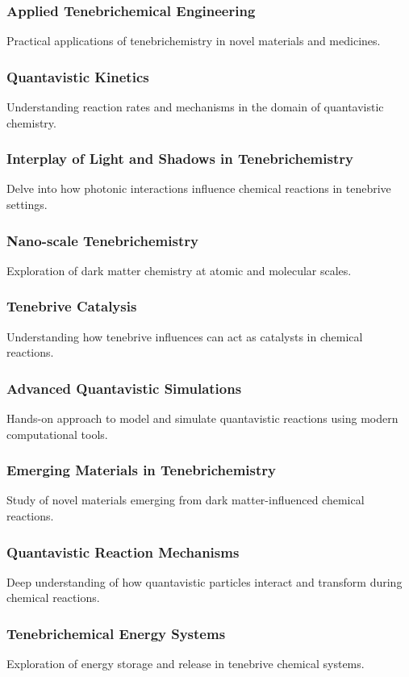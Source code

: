 \subsubsection{Applied Tenebrichemical Engineering}
Practical applications of tenebrichemistry in novel materials and medicines.
\subsubsection{Quantavistic Kinetics}
Understanding reaction rates and mechanisms in the domain of quantavistic chemistry.
\subsubsection{Interplay of Light and Shadows in Tenebrichemistry}
Delve into how photonic interactions influence chemical reactions in tenebrive settings.
\subsubsection{Nano-scale Tenebrichemistry}
Exploration of dark matter chemistry at atomic and molecular scales.
\subsubsection{Tenebrive Catalysis}
Understanding how tenebrive influences can act as catalysts in chemical reactions.
\subsubsection{Advanced Quantavistic Simulations}
Hands-on approach to model and simulate quantavistic reactions using modern computational tools.
\subsubsection{Emerging Materials in Tenebrichemistry}
Study of novel materials emerging from dark matter-influenced chemical reactions.
\subsubsection{Quantavistic Reaction Mechanisms}
Deep understanding of how quantavistic particles interact and transform during chemical reactions.
\subsubsection{Tenebrichemical Energy Systems}
Exploration of energy storage and release in tenebrive chemical systems.
